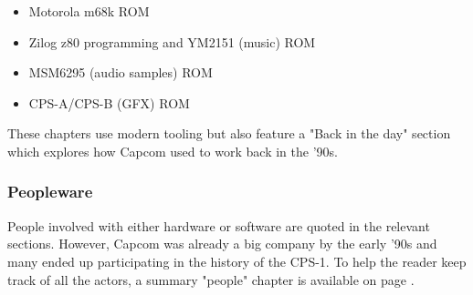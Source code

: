 \begin{itemize}[topsep=0pt]
\item Motorola m68k ROM
\item Zilog z80 programming and YM2151 (music) ROM
\item MSM6295 (audio samples) ROM
\item CPS-A/CPS-B (GFX) ROM
\end{itemize}

These chapters use modern tooling but also feature a "Back in the day" section which explores how Capcom used to work back in the '90s.

\subsubsection{Peopleware}
People involved with either hardware or software are quoted in the relevant sections. However, Capcom was already a big company by the early '90s and many ended up participating in the history of the CPS-1. To help the reader keep track of all the actors, a summary "people" chapter is available on page \pageref{people}.
